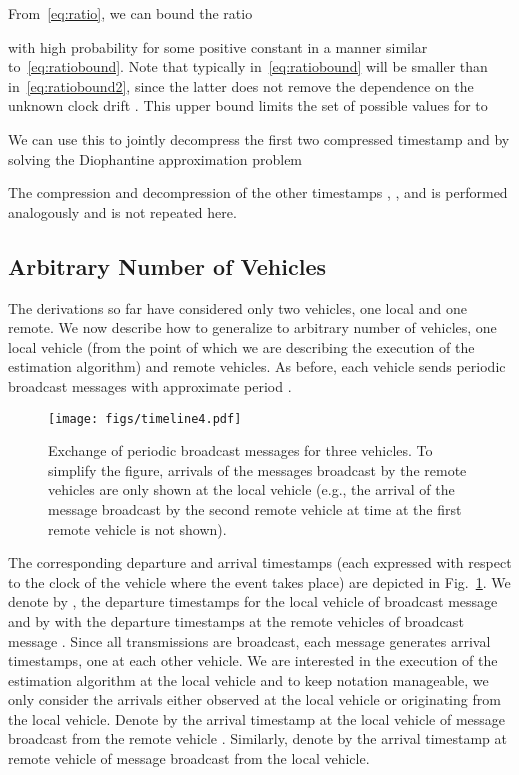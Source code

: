 \documentclass[12pt,journal,final,onecolumn]{IEEEtran}
\theoremstyle{definition}
\theoremstyle{myremark}
\begin{document}
From~\eqref{eq:ratio}, we can bound the ratio

with high probability for some positive constant  in a manner
similar to~\eqref{eq:ratiobound}.  Note that typically 
in~\eqref{eq:ratiobound} will be smaller than 
in~\eqref{eq:ratiobound2}, since the latter does not remove the dependence on
the unknown clock drift . This upper bound limits the set of possible
values for  to

We can use this to jointly decompress the first two compressed timestamp
 and  by solving the Diophantine approximation problem


The compression and decompression of the other timestamps , ,
and  is performed analogously and is not repeated here.


\subsection{Arbitrary Number of Vehicles}
\label{sec:main_multiple}

The derivations so far have considered only two vehicles, one local and one remote.
We now describe how to generalize to arbitrary number of vehicles, one local
vehicle (from the point of which we are describing the execution of the
estimation algorithm) and  remote vehicles. As before, each vehicle sends
periodic broadcast messages with approximate period . 

\begin{figure}[htbp]
    \centering 
    \texttt{[image: figs/timeline4.pdf]} 

    \caption{Exchange of periodic broadcast messages for three vehicles. To simplify the figure,
    arrivals of the messages broadcast by the remote vehicles are only shown at
    the local vehicle (e.g., the arrival of the message broadcast by the second remote
    vehicle at time  at the first remote vehicle is not shown).}
    \label{fig:timeline4}
\end{figure}

The corresponding departure and arrival timestamps (each expressed with respect
to the clock of the vehicle where the event takes place) are depicted in
Fig.~\ref{fig:timeline4}. We denote by , the departure timestamps for
the local vehicle of broadcast message  and by  with
 the departure timestamps at the  remote vehicles of
broadcast message . Since all transmissions are broadcast, each message
generates  arrival timestamps, one at each other vehicle. We are interested
in the execution of the estimation algorithm at the local vehicle and to keep
notation manageable, we only consider the arrivals either observed at the local
vehicle or originating from the local vehicle. Denote by  the
arrival timestamp at the local vehicle of message  broadcast from the remote
vehicle . Similarly, denote by  the arrival timestamp at
remote vehicle  of message  broadcast from the local vehicle.
\end{document}
